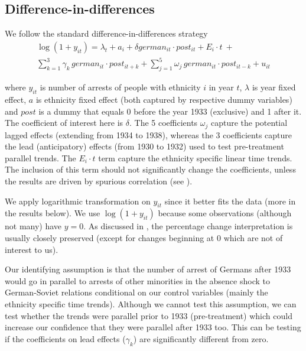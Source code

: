 \subsection{Difference-in-differences}

We follow the standard difference-in-differences strategy
\begin{multline}
 \log\left(1 + y_{it}\right) = \lambda_t + a_i  + \delta german_{it} \cdot post_{it} + E_i \cdot t \: + \\ \sum_{k= 1}^3 \gamma_k \, german_{it} \cdot post_{it+ k} + \sum_{j= 1}^5 \omega_j \, german_{it} \cdot post_{it - k}  + u_{it}   
\end{multline}

where $y_{it}$ is number of arrests of people with ethnicity $i$ in year $t$, $\lambda$ is year fixed effect, $a$ is ethnicity fixed effect (both captured by respective dummy variables) and $post$ is a dummy that equals 0 before the year 1933 (exclusive) and 1 after it. The coefficient of interest here is $\delta$. The 5 coefficients $\omega_j$ capture the potential lagged effects (extending from 1934 to 1938), whereas the 3 coefficients capture the lead (anticipatory) effects (from 1930 to 1932) used to test pre-treatment parallel trends.  The $ E_i \cdot t$ term capture the ethnicity specific linear time trends. The inclusion of this term should not significantly  change the coefficients, unless the results are driven by spurious correlation (see \citealt{angrist_mostly_2009}). 

 We apply logarithmic transformation on $y_{it}$ since it better fits the data (more in the results below).  We use $\log\left(1 + y_{it}\right)$ because some observations (although not many) have $y = 0$. As discussed in \citet[p. 193]{wooldridge_introductory_2015},  the percentage change interpretation is usually  closely preserved (except for changes beginning at 0 which are not of interest to us).   

Our identifying assumption is that the number of arrest of Germans after 1933 would go in parallel to arrests of other minorities in the absence shock to German-Soviet relations conditional on our control variables (mainly the ethnicity specific time trends). Although we cannot test this assumption, we can test whether the trends were parallel prior to 1933 (pre-treatment) which could increase our confidence that they were parallel after 1933 too. This can be testing if the coefficients on lead effects ($\gamma_k$) are significantly different from zero.  

